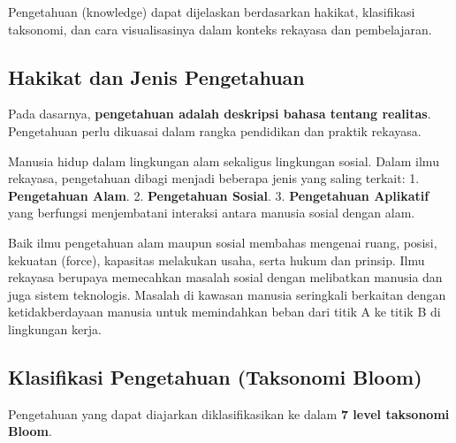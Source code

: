 \documentclass[
  letterpaper,
  DIV=11,
  numbers=noendperiod]{scrreprt}
\begin{document}
Pengetahuan (knowledge) dapat dijelaskan berdasarkan hakikat,
klasifikasi taksonomi, dan cara visualisasinya dalam konteks rekayasa
dan pembelajaran.

\subsection{Hakikat dan Jenis
Pengetahuan}\label{hakikat-dan-jenis-pengetahuan}

Pada dasarnya, \textbf{pengetahuan adalah deskripsi bahasa tentang
realitas}. Pengetahuan perlu dikuasai dalam rangka pendidikan dan
praktik rekayasa.

Manusia hidup dalam lingkungan alam sekaligus lingkungan sosial. Dalam
ilmu rekayasa, pengetahuan dibagi menjadi beberapa jenis yang saling
terkait: 1. \textbf{Pengetahuan Alam}. 2. \textbf{Pengetahuan Sosial}.
3. \textbf{Pengetahuan Aplikatif} yang berfungsi menjembatani interaksi
antara manusia sosial dengan alam.

Baik ilmu pengetahuan alam maupun sosial membahas mengenai ruang,
posisi, kekuatan (force), kapasitas melakukan usaha, serta hukum dan
prinsip. Ilmu rekayasa berupaya memecahkan masalah sosial dengan
melibatkan manusia dan juga sistem teknologis. Masalah di kawasan
manusia seringkali berkaitan dengan ketidakberdayaan manusia untuk
memindahkan beban dari titik A ke titik B di lingkungan kerja.

\subsection{Klasifikasi Pengetahuan (Taksonomi
Bloom)}\label{klasifikasi-pengetahuan-taksonomi-bloom}

Pengetahuan yang dapat diajarkan diklasifikasikan ke dalam \textbf{7
level taksonomi Bloom}.
\end{document}
